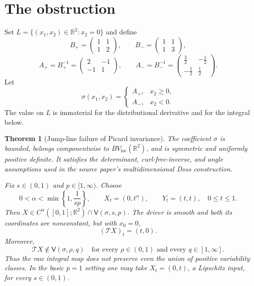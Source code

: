 \documentclass[11pt]{article}
\newtheorem{theorem}{Theorem}
\newcommand{\R}{\mathbb{R}}
\newcommand{\BV}{BV_{\mathrm{loc}}}
\newcommand{\V}{\mathsf{V}}
\newcommand{\Tmap}{\mathcal{T}}
\begin{document}
\section{The obstruction}

Set $L=\{(x_1,x_2)\in\R^2:x_2=0\}$ and define
\[
 B_+=\begin{pmatrix}1&1\\[2pt]1&2\end{pmatrix},
 \qquad
 B_-=\begin{pmatrix}1&1\\[2pt]1&3\end{pmatrix},
\]
\[
 A_+=B_+^{-1}=\begin{pmatrix}2&-1\\[2pt]-1&1\end{pmatrix},
 \qquad
 A_-=B_-^{-1}=\begin{pmatrix}\frac32&-\frac12\\[2pt]-\frac12&\frac12\end{pmatrix}.
\]
Let
\[
 \sigma(x_1,x_2)=
 \begin{cases}
 A_+,&x_2\geq0,\\
 A_-,&x_2<0.
 \end{cases}
\]
The value on $L$ is immaterial for the distributional derivative and for the
integral below.

\begin{theorem}[Jump-line failure of Picard invariance]\label{thm:main}
The coefficient $\sigma$ is bounded, belongs componentwise to
$\BV(\R^2)$, and is symmetric and uniformly positive definite.  It satisfies
the determinant, curl-free-inverse, and angle assumptions used in the source
paper's multidimensional Doss construction.

Fix $s\in(0,1)$ and $p\in[1,\infty)$.  Choose
\[
 0<\alpha<\min\left\{1,\frac1{sp}\right\},
 \qquad X_t=(0,t^\alpha),\qquad Y_t=(t,t),\quad 0\leq t\leq1.
\]
Then $X\in C^\alpha([0,1];\R^2)\cap\V(\sigma,s,p)$.  The driver is smooth
and both its coordinates are nonconstant, but with $x_0=0$,
\[
 (\Tmap X)_t=(t,0).
\]
Moreover,
\[
 \Tmap X\notin\V(\sigma,\rho,q)
 \quad\text{for every }\rho\in(0,1)\text{ and every }q\in[1,\infty].
\]
Thus the raw integral map does not preserve even the union of positive
variability classes.  In the basic $p=1$ setting one may take $X_t=(0,t)$, a
Lipschitz input, for every $s\in(0,1)$.
\end{theorem}
\end{document}
